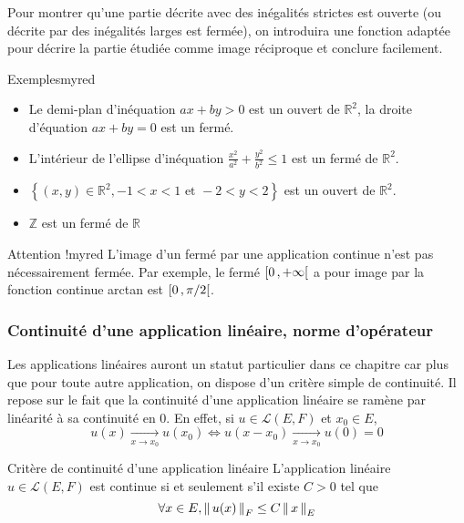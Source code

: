     Pour montrer qu’une partie décrite avec des inégalités strictes est ouverte (ou décrite par des inégalités larges est fermée), on introduira une fonction adaptée pour décrire la partie étudiée comme image réciproque et conclure facilement.

    \begin{omed}{Exemples}{myred}
        \begin{itemize}
            \item Le demi-plan d’inéquation $ax + by > 0$ est un ouvert de $\mathbb{R}^2$, la droite d’équation $ax + by = 0$ est un fermé.
            \item L’intérieur de l’ellipse d’inéquation $\frac{x^2}{a^2} + \frac{y^2}{b^2} \leq 1$ est un fermé de $\mathbb{R}^2$.
            \item $\left\{ (x,y) \in \mathbb{R}^2, -1 < x < 1 \text{ et } -2 < y < 2 \right\}$ est un ouvert de $\mathbb{R}^2$.
            \item $\mathbb{Z}$ est un fermé de $\mathbb{R}$
        \end{itemize}
    \end{omed}

    \begin{omed}{Attention !}{myred}
        L’image d’un fermé par une application continue n’est pas nécessairement fermée. Par exemple, le fermé $\left[ 0 \, , +\infty \right[$ a pour image par la fonction continue arctan est $\left[ 0 \, , \pi / 2 \right[$.
    \end{omed}

    \subsubsection{Continuité d’une application linéaire, norme d’opérateur}

    Les applications linéaires auront un statut particulier dans ce chapitre car plus que pour toute autre application, on dispose d’un critère simple de continuité. Il repose sur le fait que la continuité d’une application linéaire se ramène par linéarité à sa continuité en $0$. En effet, si $u \in \mathcal{L}(E,F)$ et $x_0 \in E$,
    \[ u(x) \underset{x \rightarrow x_0}{\longrightarrow} u(x_0) \iff u(x-x_0) \underset{x \rightarrow x_0}{\longrightarrow} u(0) = 0 \]
    
    \begin{theo}{Critère de continuité d’une application linéaire}{}
        L’application linéaire $u \in \mathcal{L}(E,F)$ est continue si et seulement s’il existe $C > 0$ tel que 
        \[ \forall x \in E, \left\lVert \,u(x) \, \right\rVert_F \leq C \left\lVert \,x \, \right\rVert_E \] 
    \end{theo}

